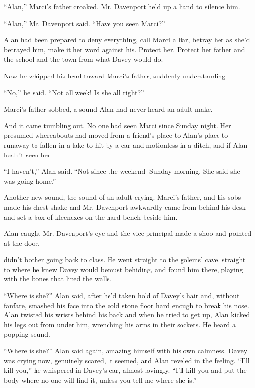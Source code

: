 ``Alan,'' Marci's father croaked.  Mr.  Davenport held up a hand to
silence him.

``Alan,'' Mr.  Davenport said.  ``Have you seen Marci?''

Alan had been prepared to deny everything, call Marci a liar, betray
her as she'd betrayed him, make it her word against his.  Protect her. 
Protect her father and the school and the town from what Davey would
do.

Now he whipped his head toward Marci's father, suddenly understanding.

``No,'' he said.  ``Not all week!  Is she all right?''

Marci's father sobbed, a sound Alan had never heard an adult make.

And it came tumbling out.  No one had seen Marci since Sunday night. 
Her presumed whereabouts had moved from a friend's place to Alan's
place to runaway to fallen in a lake to hit by a car and motionless in
a ditch, and if Alan hadn't seen her\dash{}

``I haven't,'' Alan said.  ``Not since the weekend.  Sunday morning. 
She said she was going home.''

Another new sound, the sound of an adult crying.  Marci's father, and
his sobs made his chest shake and Mr.  Davenport awkwardly came from
behind his desk and set a box of kleenexes on the hard bench beside
him.

Alan caught Mr.  Davenport's eye and the vice principal made a shoo
and pointed at the door.

 didn't bother going back to class.  He went straight to the
golems' cave, straight to where he knew Davey would be\dash{}must
be\dash{}hiding, and found him there, playing with the bones that lined
the walls.

``Where is she?'' Alan said, after he'd taken hold of Davey's hair
and, without fanfare, smashed his face into the cold stone floor hard
enough to break his nose.  Alan twisted his wrists behind his back and
when he tried to get up, Alan kicked his legs out from under him,
wrenching his arms in their sockets.  He heard a popping sound.

``Where is she?'' Alan said again, amazing himself with his own
calmness.  Davey was crying now, genuinely scared, it seemed, and Alan
reveled in the feeling.  ``I'll kill you,'' he whispered in Davey's
ear, almost lovingly.  ``I'll kill you and put the body where no one
will find it, unless you tell me where she is.''

